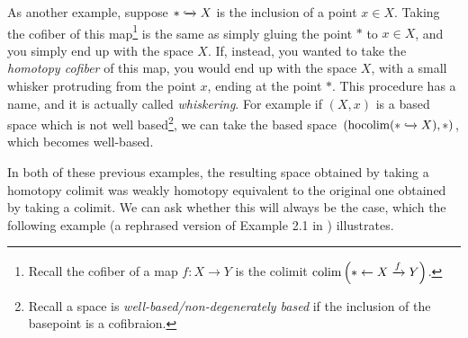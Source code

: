 \begin{example} As another example, suppose $\ast \xhookrightarrow{} X$ is the inclusion of a point $x\in X$. Taking the cofiber of this map\footnote{Recall the cofiber of a map $f: X \to Y$ is the colimit $\mathop{\operatorname*{colim}} \left( \ast \leftarrow X \xrightarrow{f} Y \right)$.} is the same as simply gluing the point $\ast$ to $x\in X$, and you simply end up with the space $X$. If, instead, you wanted to take the \textit{homotopy cofiber} of this map, you would end up with the space $X$, with a small whisker protruding from the point $x$, ending at the point $\ast$. This procedure has a name, and it is actually called \textit{whiskering}. For example if $(X,x)$ is a based space which is not well based\footnote{Recall a space is \textit{well-based/non-degenerately based} if the inclusion of the basepoint is a cofibraion.}, we can take the based space $(\mathop{\operatorname*{hocolim}}(\ast \xhookrightarrow{} X),\ast)$, which becomes well-based.
\end{example}

\begin{figure}[H]
  \centering
\end{figure}


In both of these previous examples, the resulting space obtained by taking a homotopy colimit was weakly homotopy equivalent to the original one obtained by taking a colimit. We can ask whether this will always be the case, which the following example (a rephrased version of Example 2.1 in \cite{Dugger}) illustrates.

